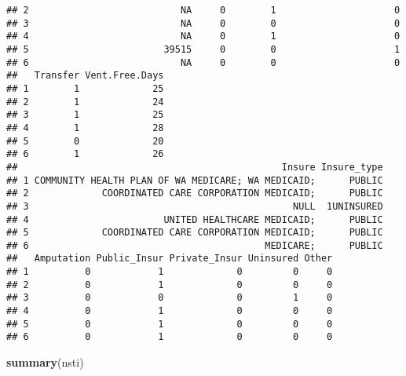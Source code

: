 \documentclass[]{article}
\newenvironment{Shaded}{\begin{snugshade}}{\end{snugshade}}
\newcommand{\KeywordTok}[1]{\textcolor[rgb]{0.13,0.29,0.53}{\textbf{#1}}}
\newcommand{\NormalTok}[1]{#1}
\begin{document}
\begin{verbatim}
## 2                           NA     0        1                     0
## 3                           NA     0        0                     0
## 4                           NA     0        1                     0
## 5                        39515     0        0                     1
## 6                           NA     0        0                     0
##   Transfer Vent.Free.Days
## 1        1             25
## 2        1             24
## 3        1             25
## 4        1             28
## 5        0             20
## 6        1             26
##                                               Insure Insure_type
## 1 COMMUNITY HEALTH PLAN OF WA MEDICARE; WA MEDICAID;      PUBLIC
## 2             COORDINATED CARE CORPORATION MEDICAID;      PUBLIC
## 3                                               NULL  1UNINSURED
## 4                        UNITED HEALTHCARE MEDICAID;      PUBLIC
## 5             COORDINATED CARE CORPORATION MEDICAID;      PUBLIC
## 6                                          MEDICARE;      PUBLIC
##   Amputation Public_Insur Private_Insur Uninsured Other
## 1          0            1             0         0     0
## 2          0            1             0         0     0
## 3          0            0             0         1     0
## 4          0            1             0         0     0
## 5          0            1             0         0     0
## 6          0            1             0         0     0
\end{verbatim}

\begin{Shaded}
\begin{Highlighting}[]
\KeywordTok{summary}\NormalTok{(nsti)}
\end{Highlighting}
\end{Shaded}
\end{document}
